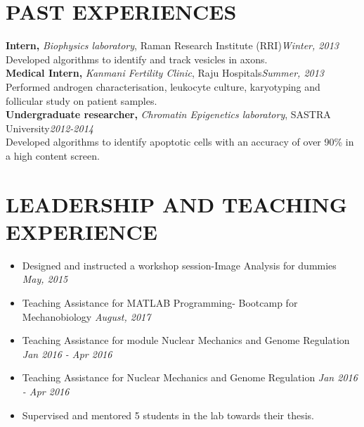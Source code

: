 \documentclass[letterpaper,11pt]{article}
\begin{document}
\vspace{1mm}
\section{\bf PAST EXPERIENCES}
{\bf Intern, }{\emph{Biophysics laboratory}}{, Raman Research Institute (RRI)}\hfill {\emph {Winter, 2013}} \\
\hspace*{5ex}Developed algorithms to identify and track vesicles in axons.\\
{\bf Medical Intern, }{\emph {Kanmani Fertility Clinic}, Raju Hospitals}\hfill {\emph {Summer, 2013}} \\
\hspace*{5ex} Performed androgen characterisation, leukocyte culture, karyotyping and follicular study on patient samples.\\
{\bf Undergraduate researcher, }{\emph{Chromatin Epigenetics laboratory}}{, SASTRA University}\hfill {\emph {2012-2014}} \\
\hspace*{5ex}Developed algorithms to identify apoptotic cells with an accuracy of over 90\% in a high content screen.

\vspace{1mm}
\section{\bf LEADERSHIP AND TEACHING EXPERIENCE}
\begin{itemize}
    \item Designed and instructed a workshop session-Image Analysis for dummies  \hfill \emph {May, 2015}
    \item Teaching Assistance for MATLAB Programming- Bootcamp for Mechanobiology \hfill \emph {August, 2017} 
    \item Teaching Assistance for module Nuclear Mechanics and Genome Regulation \hfill \emph{Jan 2016 - Apr 2016} 
    \item Teaching Assistance for Nuclear Mechanics and Genome Regulation \hfill \emph{Jan 2016 - Apr 2016}
     \item Supervised and mentored 5 students in the lab towards their thesis.
\end{itemize}


\vspace{1mm}
\end{document}
